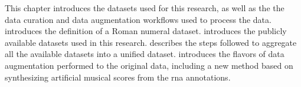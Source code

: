 
This chapter introduces the datasets used for this research,
as well as the the data curation and data augmentation
workflows used to process the data.
 introduces the definition
of a Roman numeral dataset. 
introduces the publicly available datasets used in this
research.  describes
the steps followed to aggregate all the available datasets
into a unified dataset.  introduces
the flavors of data augmentation performed to the original
data, including a new method based on synthesizing
artificial musical scores from the \gls{rna} annotations.

